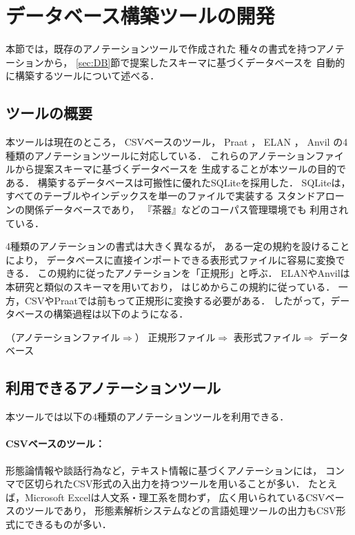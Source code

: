 \documentclass[japanese]{jnlp_1.4}
\begin{document}
\section{データベース構築ツールの開発}
\label{sec:Tools}

本節では，既存のアノテーションツールで作成された
種々の書式を持つアノテーションから，
\ref{sec:DB}節で提案したスキーマに基づくデータベースを
自動的に構築するツールについて述べる．


\subsection{ツールの概要}

本ツールは現在のところ，
CSVベースのツール，
Praat \cite{Boersma_2013_PDP}，
ELAN \cite{Brugman_2004_AMM}，
Anvil \cite{Kipp_2001_AGA}の4種類のアノテーションツールに対応している．
これらのアノテーションファイルから提案スキーマに基づくデータベースを
生成することが本ツールの目的である．
構築するデータベースは可搬性に優れたSQLiteを採用した．
SQLiteは，すべてのテーブルやインデックスを単一のファイルで実装する
スタンドアローンの関係データベースであり，
『茶器』\cite{Matsumoto_2006_ACM}などのコーパス管理環境でも
利用されている．

4種類のアノテーションの書式は大きく異なるが，
ある一定の規約を設けることにより，
データベースに直接インポートできる表形式ファイルに容易に変換できる．
この規約に従ったアノテーションを「正規形」と呼ぶ．
ELANやAnvilは本研究と類似のスキーマを用いており，
はじめからこの規約に従っている．
一方，CSVやPraatでは前もって正規形に変換する必要がある．
したがって，データベースの構築過程は以下のようになる．

\begin{center}
（アノテーションファイル$\Rightarrow$）
正規形ファイル$\Rightarrow$
表形式ファイル$\Rightarrow$
データベース
\end{center}


\subsection{利用できるアノテーションツール}

本ツールでは以下の4種類のアノテーションツールを利用できる．

\paragraph{CSVベースのツール：}
形態論情報や談話行為など，テキスト情報に基づくアノテーションには，
コンマで区切られたCSV形式の入出力を持つツールを用いることが多い．
たとえば，Microsoft Excelは人文系・理工系を問わず，
広く用いられているCSVベースのツールであり，
形態素解析システムなどの言語処理ツールの出力もCSV形式にできるものが多い．
\end{document}
